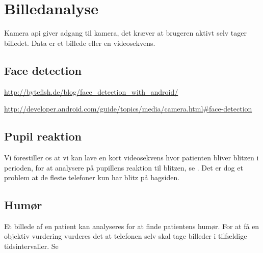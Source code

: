 \section{Billedanalyse}
Kamera api giver adgang til kamera, det kræver at brugeren aktivt selv tager billedet. Data er et billede eller en videosekvens.


\subsection{Face detection}

\url{http://bytefish.de/blog/face\_detection\_with\_android/}

\url{http://developer.android.com/guide/topics/media/camera.html#face-detection}

\subsection{Pupil reaktion}
Vi forestiller os at vi kan lave en kort videosekvens hvor patienten bliver blitzen i perioden, for at analysere på pupillens reaktion til blitzen, se \cite{hoeks1993pupillary}.
Det er dog et problem at de fleste telefoner kun har blitz på bagsiden.

\subsection{Humør}

Et billede af en patient kan analyseres for at finde patientens humør. 
For at få en objektiv vurdering vurderes det at telefonen selv skal tage billeder i tilfældige tidsintervaller. 
Se \cite{kulkarni2009facial}